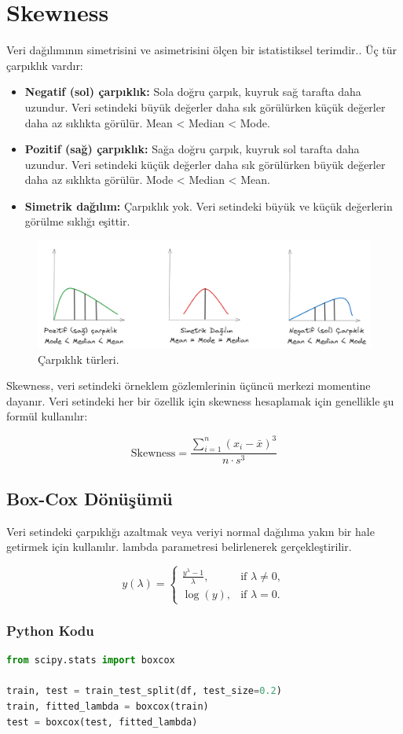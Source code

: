 \section{Skewness}
Veri dağılımının simetrisini ve asimetrisini ölçen bir istatistiksel terimdir.. Üç tür çarpıklık vardır:

\begin{itemize}
    \item \textbf{Negatif (sol) çarpıklık:} Sola doğru çarpık, kuyruk sağ tarafta daha uzundur. Veri setindeki büyük değerler daha sık görülürken küçük değerler daha az sıklıkta görülür. Mean < Median < Mode.
    \item \textbf{Pozitif (sağ) çarpıklık:} Sağa doğru çarpık, kuyruk sol tarafta daha uzundur. Veri setindeki küçük değerler daha sık görülürken büyük değerler daha az sıklıkta görülür. Mode < Median < Mean.
    \item \textbf{Simetrik dağılım:} Çarpıklık yok. Veri setindeki büyük ve küçük değerlerin görülme sıklığı eşittir.
\end{itemize}

\begin{figure}[h]
    \centering
    \includegraphics[width=1\textwidth]{images/skewness_types.png}
    \caption{Çarpıklık türleri.}
    \label{fig:enter-label}
\end{figure}

Skewness, veri setindeki örneklem gözlemlerinin üçüncü merkezi momentine dayanır. Veri setindeki her bir özellik için skewness hesaplamak için genellikle şu formül kullanılır:

\[\text{Skewness} = \frac{\sum_{i=1}^{n} (x_i - \bar{x})^3}{n \cdot s^3}\]

\subsection{Box-Cox Dönüşümü}
Veri setindeki çarpıklığı azaltmak veya veriyi normal dağılıma yakın bir hale getirmek için kullanılır. lambda parametresi belirlenerek gerçekleştirilir.

\[y(\lambda) = \begin{cases} \frac{{y^\lambda - 1}}{{\lambda}}, & \text{if } \lambda \neq 0, \\ \log(y), & \text{if } \lambda = 0. \end{cases}\]

\subsubsection{Python Kodu}

\begin{lstlisting}[language=Python]
from scipy.stats import boxcox

train, test = train_test_split(df, test_size=0.2)
train, fitted_lambda = boxcox(train)
test = boxcox(test, fitted_lambda)
\end{lstlisting}

\newpage